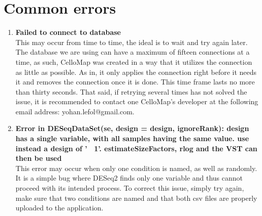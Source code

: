 \documentclass[11pt]{article}
\begin{document}
\section{Common errors \label{common_err}}
\begin{enumerate}
\item \textbf{Failed to connect to database}\\
This may occur from time to time, the ideal is to wait and try again later. The database we are using can have a maximum of fifteen connections at a time, as such, CelloMap was created in a way that it utilizes the connection as little as possible. As in, it only applies the connection right before it needs it and removes the connection once it is done. This time frame lasts no more than thirty seconds.
That said, if retrying several times has not solved the issue, it is recommended to contact one CelloMap's developer at the following email address: yohan.lefol@gmail.com.

\item \textbf{Error in DESeqDataSet(se, design = design, ignoreRank): design has a single variable, with all samples having the same value. use instead a design of '~ 1'. estimateSizeFactors, rlog and the VST can then be used}\\
This error may occur when only one condition is named, as well as randomly. It is a simple bug where DESeq2 finds only one variable and thus cannot proceed with its intended process.
To correct this issue, simply try again, make sure that two conditions are named and that both csv files are properly uploaded to the application.
  
\end{enumerate}


\end{document}
